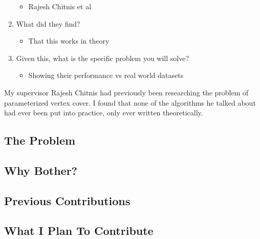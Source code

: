 \begin{enumerate}
    \begin{itemize}
        \item Rajesh Chitnis et al
    \end{itemize}
    \item What did they find?
    \begin{itemize}
        \item That this works in theory 
    \end{itemize}
    \item Given this, what is the specific problem you will solve?
    \begin{itemize}
        \item Showing their performance vs real world datasets 
    \end{itemize}
\end{enumerate}


My supervisor Rajesh Chitnis had previously been researching the problem of parameterized vertex cover. I found that none of the algorithms he talked about had ever been put into practice, only ever written theoretically. 

\subsection{The Problem}
\subsection{Why Bother?}
\subsection{Previous Contributions}
\subsection{What I Plan To Contribute}
